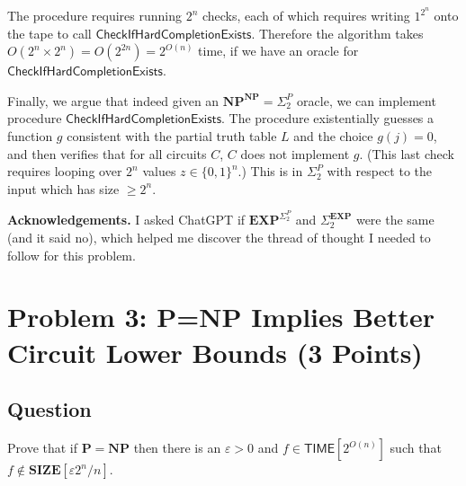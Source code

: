\documentclass{article}
\renewcommand{\P}{\mathbf{P}}
\newcommand{\NP}{\mathbf{NP}}
\newcommand{\EXP}{\mathbf{EXP}}
\newcommand{\TIME}{\mathbf{TIME}}
\newcommand{\SIZE}{\mathbf{SIZE}}
\def \TIME{{\mathsf{TIME}}}
\begin{document}
The procedure requires running $2^n$ checks, each of which requires writing $1^{2^n}$ onto the tape to call $\mathsf{CheckIfHardCompletionExists}$.
Therefore the algorithm takes $O(2^n \times 2^n) = O(2^{2n}) = 2^{O(n)}$ time, if we have an oracle for $\mathsf{CheckIfHardCompletionExists}$.

Finally, we argue that indeed given an $\NP^\NP = \Sigma_2^P$ oracle, we can implement procedure $\mathsf{CheckIfHardCompletionExists}$.
The procedure existentially guesses a function $g$ consistent with the partial truth table $L$ and the choice $g(j) = 0$, and then verifies that for all circuits $C$, $C$ does not implement $g$.  (This last check requires looping over $2^n$ values $z \in \{0, 1\}^n$.)  This is in $\Sigma_2^P$ with respect to the input which has size $\geq 2^n$.

\textbf{Acknowledgements.} I asked ChatGPT if $\EXP^{\Sigma_2^P}$ and $\Sigma_2^{\EXP}$ were the same (and it said no), which helped me discover the thread of thought I needed to follow for this problem.












\newpage

\section*{Problem 3: P=NP Implies Better Circuit Lower Bounds (3 Points)}

\subsection*{Question}
Prove that if $\P = \NP$ then there is an $\varepsilon > 0$ and $f \in \TIME[2^{O(n)}]$ such that $f \notin \SIZE[\varepsilon 2^n/n]$. 
\end{document}
